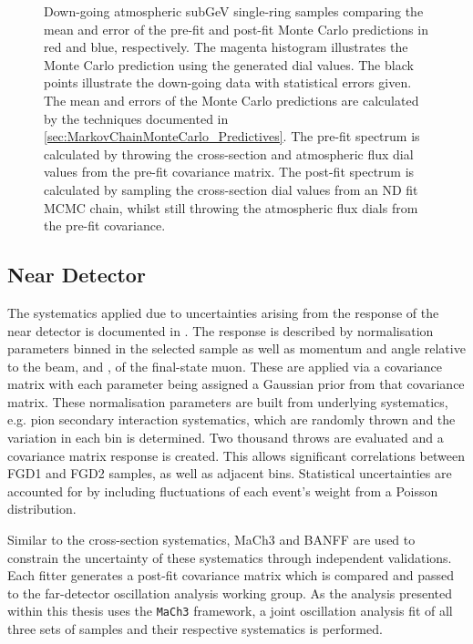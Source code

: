 \begin{figure}[h]
\begin{subfigure}[t]{0.49\textwidth}
  \end{subfigure}
  \caption{Down-going atmospheric subGeV single-ring samples comparing the mean and error of the pre-fit and post-fit Monte Carlo predictions in red and blue, respectively. The magenta histogram illustrates the Monte Carlo prediction using the generated dial values. The black points illustrate the down-going data with statistical errors given. The mean and errors of the Monte Carlo predictions are calculated by the techniques documented in \autoref{sec:MarkovChainMonteCarlo_Predictives}. The pre-fit spectrum is calculated by throwing the cross-section and atmospheric flux dial values from the pre-fit covariance matrix. The post-fit spectrum is calculated by sampling the cross-section dial values from an ND fit MCMC chain, whilst still throwing the atmospheric flux dials from the pre-fit covariance.}
  \label{fig:SelsAndSysts_DownGoingPredictives}
\end{figure}

\subsection{Near Detector}
\label{sec:SelsAndSysts_Systs_ND}

The systematics applied due to uncertainties arising from the response of the near detector is documented in \cite{thesis_clarence}. The response is described by  normalisation parameters binned in the selected sample as well as momentum and angle relative to the beam,  and \quickmath{\cos(\theta_{\mu})}, of the final-state muon. These are applied via a covariance matrix with each parameter being assigned a Gaussian prior from that covariance matrix. These normalisation parameters are built from underlying systematics, e.g. pion secondary interaction systematics, which are randomly thrown and the variation in each  bin is determined. Two thousand throws are evaluated and a covariance matrix response is created. This allows significant correlations between FGD1 and FGD2 samples, as well as adjacent  bins. Statistical uncertainties are accounted for by including fluctuations of each event's weight from a Poisson distribution.

Similar to the cross-section systematics, MaCh3 and BANFF are used to constrain the uncertainty of these systematics through independent validations. Each fitter generates a post-fit covariance matrix which is compared and passed to the far-detector oscillation analysis working group. As the analysis presented within this thesis uses the \texttt{MaCh3} framework, a joint oscillation analysis fit of all three sets of samples and their respective systematics is performed.

